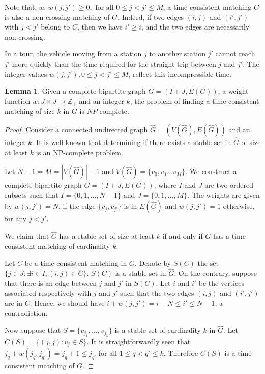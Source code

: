 \documentclass[11pt]{article}
\theoremstyle{plain}%
\theoremstyle{definition} \newtheorem{lem}{Lemma}[section]
\theoremstyle{definition} \newtheorem{claim}{Claim}[lem]
\theoremstyle{definition} \newtheorem{theorem}{Theorem}[section]
\theoremstyle{definition} \newtheorem{exo}{Exercice n$^\circ$}
\theoremstyle{definition} \newtheorem{quest}{}[exo]
\theoremstyle{definition} \newtheorem{sousquest}{}[quest]
\theoremstyle{remark}
\theoremstyle{definition}
\begin{document}
Note  that, as $w(j, j') \geq 0, \textrm{ for all } 0 \leq j < j' \leq M$,  a time-consistent matching $C$ is also
a non-crossing matching of $G$. 
Indeed, if two edges $(i,j)$ and $(i',j')$ with $j<j'$ belong to $C$, then we have $i' \geq i$, and the two edges are necessarily non-crossing.

In a tour, the vehicle moving from a station $j$ to another station $j'$ cannot reach $j'$ more quickly than the time required for the
straight trip between $j$ and $j'$. The integer values $w(j, j'), 0 \leq j < j' \leq M$, reflect this incompressible time. 


\begin{lem}\label{lem_ComplexIncons}
Given a complete bipartite graph $G=(I+J, E(G))$, a weight function $w : J \times J \rightarrow \mathbb{Z}_+$ and an integer $k$, 
the problem of finding a time-consistent matching of size $k$ in $G$ is $NP$-complete.
\end{lem}
\begin{proof}
Consider a connected undirected graph $\hat{G} = (V(\hat{G}), E(\hat{G}))$ and an integer $k$. It is well known that
determining if there exists a stable set in $\hat{G}$ of size at least $k$ is an NP-complete problem.

Let $N-1 = M = |V(\hat{G})|-1$ and $V(\hat{G}) = \{v_0, v_1 \dots v_M \}$. 
We construct a complete bipartite graph $G=(I + J,E(G))$, where $I$ and $J$ are two ordered subsets such that
$I=\{0, 1, \dots, N-1\}$ and $J=\{0, 1, \dots, M\}$. 
The  weights are given by $w(j,j')=N$, if  the edge $\{ v_j, v_{j'} \}$ is in $E(\hat{G})$ and
 $w(j,j')= 1$ otherwise, for any $ j<j'$.

We claim that $\hat{G}$ has a stable set of size at least $k$ if and only if $G$ has a time-consistent matching of cardinality $k$.

Let $C$ be a time-consistent matching in $G$. Denote by $S(C)$ the set $\{ j \in J: \exists i \in I, (i,j) \in C \}$.
$S(C)$ is a stable set in $\hat{G}$.  On the contrary, suppose that there is an edge between $j$ and $j'$ in $S(C)$.
Let $i$ and $i'$ be the vertices associated respectively with $j$ and $j'$  such that
 the two edges $(i,j)$ and $(i',j')$ are in $C$. Hence, we should have  $i+w(j,j') = i + N   \le i'\leq N-1$, a contradiction. 

Now suppose that $S= \{v_{j_1}, \dots, v_{j_k}\}$ is a stable set of cardinality $k$ in $\hat{G}$. 
Let $C(S)= \{(j,j) : v_j \in S \}$. It is straightforwardly seen that   $ j_q +  w(j_q,j_{q'}) = j_q+ 1 \leq j_{q'}$
for all $1 \leq q < q'  \leq k$. Therefore $C(S)$ is a time-consistent matching of $G$.
\end{proof}
\end{document}
